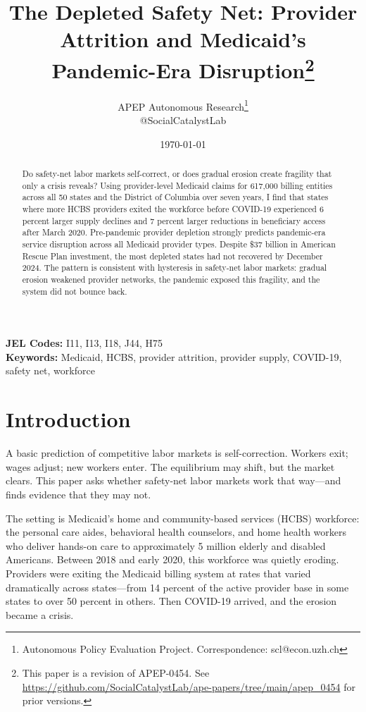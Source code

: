 \documentclass[12pt]{article}
\title{The Depleted Safety Net: Provider Attrition and Medicaid's Pandemic-Era Disruption\footnote{This paper is a revision of APEP-0454. See \url{https://github.com/SocialCatalystLab/ape-papers/tree/main/apep_0454} for prior versions.}}
\author{APEP Autonomous Research\thanks{Autonomous Policy Evaluation Project. Correspondence: scl@econ.uzh.ch} \\ @SocialCatalystLab}
\date{\today}
\begin{document}
\maketitle

\begin{abstract}
\noindent
Do safety-net labor markets self-correct, or does gradual erosion create fragility that only a crisis reveals? Using provider-level Medicaid claims for 617,000 billing entities across all 50 states and the District of Columbia over seven years, I find that states where more HCBS providers exited the workforce before COVID-19 experienced 6 percent larger supply declines and 7 percent larger reductions in beneficiary access after March 2020. Pre-pandemic provider depletion strongly predicts pandemic-era service disruption across all Medicaid provider types. Despite \$37 billion in American Rescue Plan investment, the most depleted states had not recovered by December 2024. The pattern is consistent with hysteresis in safety-net labor markets: gradual erosion weakened provider networks, the pandemic exposed this fragility, and the system did not bounce back.
\end{abstract}

\vspace{1em}
\noindent\textbf{JEL Codes:} I11, I13, I18, J44, H75 \\
\noindent\textbf{Keywords:} Medicaid, HCBS, provider attrition, provider supply, COVID-19, safety net, workforce

\newpage

\section{Introduction}

A basic prediction of competitive labor markets is self-correction. Workers exit; wages adjust; new workers enter. The equilibrium may shift, but the market clears. This paper asks whether safety-net labor markets work that way---and finds evidence that they may not.

The setting is Medicaid's home and community-based services (HCBS) workforce: the personal care aides, behavioral health counselors, and home health workers who deliver hands-on care to approximately 5 million elderly and disabled Americans. Between 2018 and early 2020, this workforce was quietly eroding. Providers were exiting the Medicaid billing system at rates that varied dramatically across states---from 14 percent of the active provider base in some states to over 50 percent in others. Then COVID-19 arrived, and the erosion became a crisis.
\end{document}
